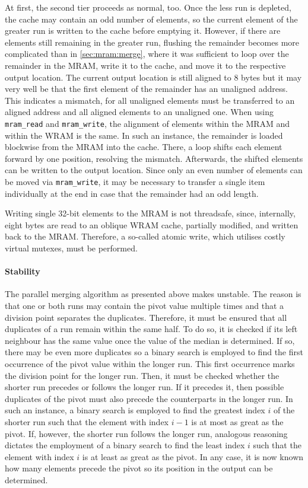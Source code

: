At first, the second tier proceeds as normal, too.
Once the less run is depleted, the cache may contain an odd number of elements, so the current element of the greater run is written to the cache before emptying it.
However, if there are elements still remaining in the greater run, flushing the remainder becomes more complicated than in \cref{sec:mram:merge}, where it was sufficient to loop over the remainder in the \ac{MRAM}, write it to the cache, and move it to the respective output location.
The current output location is still aligned to 8 bytes but it may very well be that the first element of the remainder has an unaligned address.
This indicates a mismatch, for all unaligned elements must be transferred to an aligned address and all aligned elements to an unaligned one.
When using \lstinline|mram_read| and \lstinline|mram_write|, the alignment of elements within the \ac{MRAM} and within the \ac{WRAM} is the same.
In such an instance, the remainder is loaded blockwise from the \ac{MRAM} into the cache.
There, a loop shifts each element forward by one position, resolving the mismatch.
Afterwards, the shifted elements can be written to the output location.
Since only an even number of elements can be moved via \lstinline|mram_write|, it may be necessary to transfer a single item individually at the end in case that the remainder had an odd length.

Writing single 32-bit elements to the \ac{MRAM} is not threadsafe, since, internally, eight bytes are read to an oblique \ac{WRAM} cache, partially modified, and written back to the \ac{MRAM}.
Therefore, a so-called atomic write, which utilises costly virtual mutexes, must be performed.


\paragraph{Stability}
The parallel merging algorithm as presented above makes \MS{} unstable.
The reason is that one or both runs may contain the pivot value multiple times and that a division point separates the duplicates.
Therefore, it must be ensured that all duplicates of a run remain within the same half.
To do so, it is checked if its left neighbour has the same value once the value of the median is determined.
If so, there may be even more duplicates so a binary search is employed to find the first occurrence of the pivot value within the longer run.
This first occurrence marks the division point for the longer run.
Then, it must be checked whether the shorter run precedes or follows the longer run.
If it precedes it, then possible duplicates of the pivot must also precede the counterparts in the longer run.
In such an instance, a binary search is employed to find the greatest index \(i\) of the shorter run such that the element with index \(i - 1\) is at most as great as the pivot.
If, however, the shorter run follows the longer run, analogous reasoning dictates the employment of a binary search to find the least index \(i\) such that the element with index \(i\) is at least as great as the pivot.
In any case, it is now known how many elements precede the pivot so its position in the output can be determined.


